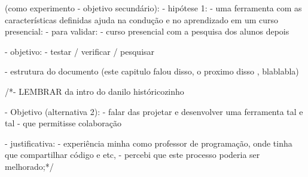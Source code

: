                     (como experimento - objetivo secundário):
                        - hipótese 1:
                            - uma ferramenta com as características definidas ajuda na condução e no aprendizado em um curso presencial:
                            - para validar:
                                - curso presencial com a pesquisa dos alunos depois

            - objetivo:
                - testar / verificar / pesquisar

            - estrutura do documento (este capitulo falou disso, o proximo disso , blablabla)

            /*- LEMBRAR da intro do danilo históricozinho


            - Objetivo (alternativa 2):
                - falar das projetar e desenvolver uma ferramenta tal e tal
                - que permitisse colaboração

                - justificativa:
                    - experiência minha como professor de programação, onde tinha que compartilhar código e etc,
                    - percebi que este processo poderia ser melhorado;*/

